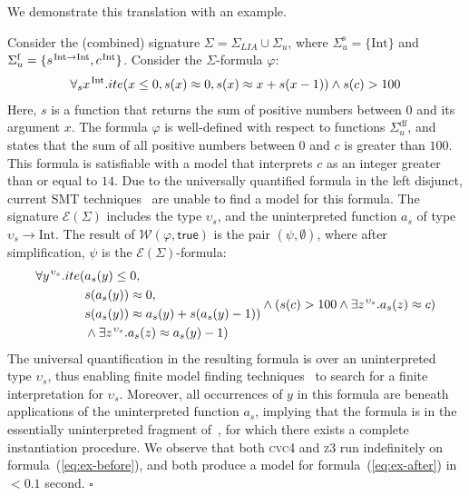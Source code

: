 \documentclass[runningheads,a4paper]{llncs}
\newcommand{\con}[1]{\mathsf{#1}}
\newcommand{\cvc}{\textsc{cvc}{\small 4}\xspace}
\newcommand{\ziii}{\textsc{z}{\small 3}\xspace}
\newcommand{\teq}{\approx}
\newcommand{\conv}{\mathcal{W}}
\newcommand{\ssorts}[1]{#1^\mathrm{s}}
\newcommand{\sfuns}[1]{#1^\mathrm{f}}
\newcommand{\sfundefs}[1]{#1^\mathrm{df}}
\newcommand{\sortint}{\mathrm{Int}}
\newcommand{\ptrue}{\con{true}}
\newcommand{\farg}[1]{a_{#1}}
\newcommand{\fargsort}[1]{\upsilon_{#1}}
\newcommand{\Sigmalia}{\Sigma_{LIA}}
\newcommand{\extendsig}[1]{\mathcal{E}( #1 )}
\newcommand{\vthinspace}{\kern+0.083333em}
\newcommand{\typ}[1]{^{\vthinspace #1}}
\begin{document}
We demonstrate this translation with an example.

\begin{example}
Consider the (combined) signature $\Sigma = \Sigmalia \cup \Sigma_u$,
where $\ssorts{\Sigma_u} = \{ \sortint \}$ and 
$\sfuns{\Sigma_u} = \{ s\typ{ \sortint \rightarrow \sortint }, c\typ{ \sortint } \}$.
Consider the $\Sigma$-formula $\varphi$:
\begin{eqnarray} \label{eq:ex-before}
\forall_{s} x\typ{\sortint}. ite( x \leq 0, s(x) \teq 0, s( x ) \teq x + s( x-1 ) ) \wedge s( c ) > 100
\end{eqnarray} 
Here, $s$ is a function that returns the sum of positive numbers between $0$ and its argument $x$.
The formula $\varphi$ is well-defined with respect to functions $\sfundefs{\Sigma_u}$,
and states that the sum of all positive numbers between $0$ and $c$ is greater than $100$.
This formula is satisfiable with a model that interprets $c$ as an integer greater than or equal to $14$.
Due to the universally quantified formula in the left disjunct,
current SMT techniques~\cite{GeDeM-CAV-09, ReyEtAl-1-RR-13} are unable to find a model for this formula.
The signature $\extendsig{\Sigma}$ includes the type $\fargsort{s}$,
and the uninterpreted function $\farg{s}$ of type $\fargsort{s} \rightarrow \sortint$.
The result of $\conv( \varphi, \ptrue )$ is the pair $( \psi, \emptyset )$, where after simplification, $\psi$ is the $\extendsig{\Sigma}$-formula:
\begin{eqnarray} \label{eq:ex-after}
\begin{split}
\forall y\typ{\fargsort{s}}. ite( & \farg{s}( y ) \leq 0,  \\
 & s(\farg{s}( y )) \teq 0, \\
 & s(\farg{s}( y )) \teq \farg{s}( y ) + s( \farg{s}( y )-1 ) ) \\
 & \wedge \exists z\typ{\fargsort{s}}. \farg{s}( z ) \teq \farg{s}( y )-1 )
\end{split}  
\wedge ( s( c ) > 100 \wedge \exists z\typ{\fargsort{s}}. \farg{s}( z ) \teq c )
\end{eqnarray} 
The universal quantification in the resulting formula is over an uninterpreted type $\fargsort{s}$, 
thus enabling finite model finding techniques~\cite{ReyEtAl-1-RR-13} to search for a finite interpretation for $\fargsort{s}$.
Moreover, all occurrences of $y$ in this formula are beneath applications of the uninterpreted function $\farg{s}$,
implying that the formula is in the essentially uninterpreted fragment of~\cite{GeDeM-CAV-09}, for which there exists a complete instantiation procedure.
We observe that both \cvc and \ziii run indefinitely on formula~(\ref{eq:ex-before}),
and both produce a model for formula~(\ref{eq:ex-after}) in $<0.1$ second.
$\square$
\end{example}
\end{document}
